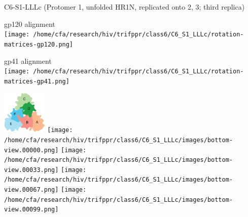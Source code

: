 \begin{frame}[fragile]{C6-S1-LLLc {\tiny (Protomer 1, unfolded HR1N, replicated onto 2, 3; third replica)}}
    \begin{center}
        \begin{minipage}{0.47\textwidth}
            \begin{center}
                gp120 alignment\\
                \texttt{[image: /home/cfa/research/hiv/trifppr/class6/C6\_S1\_LLLc/rotation-matrices-gp120.png]}
            \end{center}
        \end{minipage}
        \begin{minipage}{0.47\textwidth}
            \begin{center}
                gp41 alignment\\
                \texttt{[image: /home/cfa/research/hiv/trifppr/class6/C6\_S1\_LLLc/rotation-matrices-gp41.png]}
            \end{center}
        \end{minipage}

        \includegraphics[width=0.16\textwidth]{trimer_paint_bottom_sodroski_smol.png}
        \texttt{[image: /home/cfa/research/hiv/trifppr/class6/C6\_S1\_LLLc/images/bottom-view.00000.png]}
        \texttt{[image: /home/cfa/research/hiv/trifppr/class6/C6\_S1\_LLLc/images/bottom-view.00033.png]}
        \texttt{[image: /home/cfa/research/hiv/trifppr/class6/C6\_S1\_LLLc/images/bottom-view.00067.png]}
        \texttt{[image: /home/cfa/research/hiv/trifppr/class6/C6\_S1\_LLLc/images/bottom-view.00099.png]}

    \end{center}
\end{frame}

